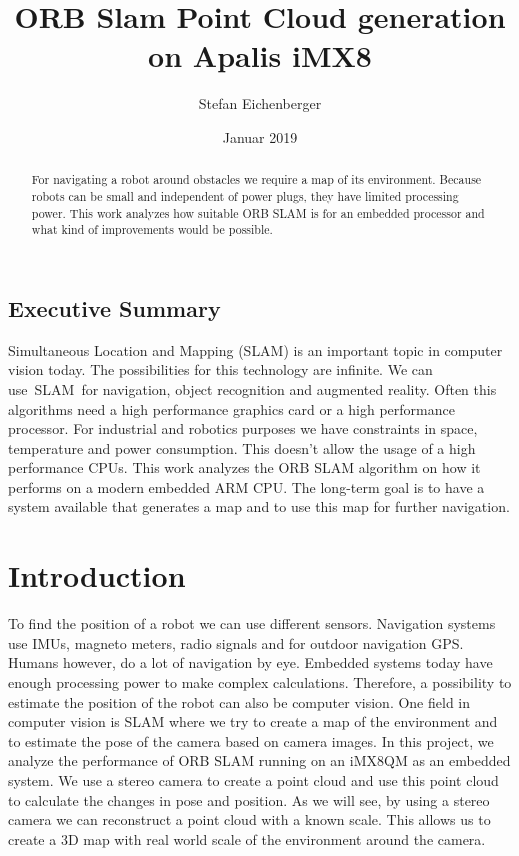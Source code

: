 \documentclass[11pt,a4paper,titlepage,oneside]{report}
\title{ORB Slam Point Cloud generation on Apalis iMX8}
\author{Stefan Eichenberger}
\date{Januar 2019}
\begin{document}
\maketitle

\begin{abstract}
	For navigating a robot around obstacles we require a map of its environment. Because robots can be small and independent of power plugs, they have limited processing power. This work analyzes how suitable ORB SLAM is for an embedded processor and what kind of improvements would be possible.
\end{abstract}

\section*{Executive Summary}
Simultaneous Location and Mapping (SLAM) is an important topic in computer vision today. The possibilities for this technology are infinite. We can use SLAM for navigation, object recognition and augmented reality. Often this algorithms need a high performance graphics card or a high performance processor. For industrial and robotics purposes we have constraints in space, temperature and power consumption. This doesn’t allow the usage of a high performance CPUs. This work analyzes the ORB SLAM algorithm on how it performs on a modern embedded ARM CPU. The long-term goal is to have a system available that generates a map and to use this map for further navigation.

\tableofcontents

\chapter{Introduction}
To find the position of a robot we can use different sensors. Navigation systems use IMUs, magneto meters, radio signals and for outdoor navigation GPS. Humans however, do a lot of navigation by eye. Embedded systems today have enough processing power to make complex calculations. Therefore, a possibility to estimate the position of the robot can also be computer vision. One field in computer vision is SLAM where we try to create a map of the environment and to estimate the pose of the camera based on camera images. In this project, we analyze the performance of ORB SLAM \cite{orbslam} running on an iMX8QM as an embedded system. We use a stereo camera to create a point cloud and use this point cloud to calculate the changes in pose and position. As we will see, by using a stereo camera we can reconstruct a point cloud with a known scale. This allows us to create a 3D map with real world scale of the environment around the camera.
\end{document}
